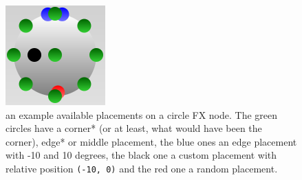 \begin{figure}[h]
  \centering\includegraphics{images/placements}
  \caption{an example available placements on a circle FX node. The green circles have a corner* (or at least, what would have been the corner), edge* or middle placement, the blue ones an edge placement with -10 and 10 degrees, the black one a custom placement with relative position \lstinline{(-10, 0)} and the red one a random placement.}
  \label{fig:placements}
\end{figure}

